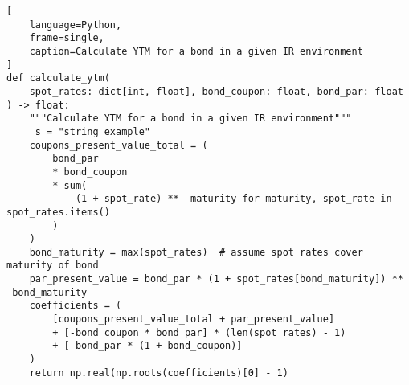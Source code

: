 \documentclass[titlepage]{article}
\begin{document}
\begin{minipage}{\linewidth}
\begin{lstlisting}[
    language=Python,
    frame=single,
    caption=Calculate YTM for a bond in a given IR environment
]
def calculate_ytm(
    spot_rates: dict[int, float], bond_coupon: float, bond_par: float
) -> float:
    """Calculate YTM for a bond in a given IR environment"""
    _s = "string example"
    coupons_present_value_total = (
        bond_par
        * bond_coupon
        * sum(
            (1 + spot_rate) ** -maturity for maturity, spot_rate in spot_rates.items()
        )
    )
    bond_maturity = max(spot_rates)  # assume spot rates cover maturity of bond
    par_present_value = bond_par * (1 + spot_rates[bond_maturity]) ** -bond_maturity
    coefficients = (
        [coupons_present_value_total + par_present_value]
        + [-bond_coupon * bond_par] * (len(spot_rates) - 1)
        + [-bond_par * (1 + bond_coupon)]
    )
    return np.real(np.roots(coefficients)[0] - 1)
\end{lstlisting}
\end{minipage}
\end{document}
